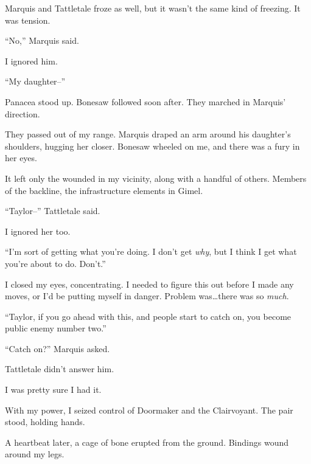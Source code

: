 Marquis and Tattletale froze as well, but it wasn't the same kind of freezing.  It was tension.



``No,'' Marquis said.



I ignored him.



``My daughter--''



Panacea stood up.  Bonesaw followed soon after.  They marched in Marquis' direction.



They passed out of my range.  Marquis draped an arm around his daughter's shoulders, hugging her closer.  Bonesaw wheeled on me, and there was a fury in her eyes.



It left only the wounded in my vicinity, along with a handful of others.  Members of the backline, the infrastructure elements in Gimel.



``Taylor--'' Tattletale said.



I ignored her too.



``I'm sort of getting what you're doing.  I don't get \emph{why}, but I think I get what you're about to do.  Don't.''



I closed my eyes, concentrating.  I needed to figure this out before I made any moves, or I'd be putting myself in danger.  Problem was\ldots there was so \emph{much}.



``Taylor, if you go ahead with this, and people start to catch on, you become public enemy number two.''



``Catch on?'' Marquis asked.



Tattletale didn't answer him.



I was pretty sure I had it.



With my power, I seized control of Doormaker and the Clairvoyant.  The pair stood, holding hands.



A heartbeat later, a cage of bone erupted from the ground.  Bindings wound around my legs.



